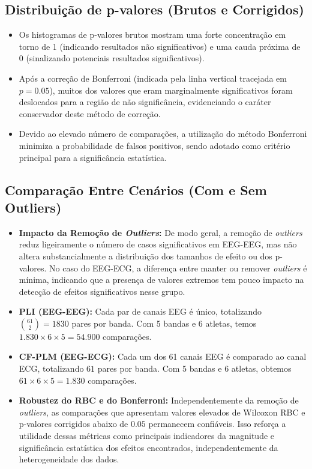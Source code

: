 \subsection{Distribuição de p-valores (Brutos e Corrigidos)}
\begin{itemize}
    \item Os histogramas de p-valores brutos mostram uma forte concentração em torno de 1 (indicando resultados não significativos) e uma cauda próxima de 0 (sinalizando potenciais resultados significativos).
    \item Após a correção de Bonferroni (indicada pela linha vertical tracejada em \(p=0.05\)), muitos dos valores que eram marginalmente significativos foram deslocados para a região de não significância, evidenciando o caráter conservador deste método de correção.
    \item Devido ao elevado número de comparações, a utilização do método Bonferroni minimiza a probabilidade de falsos positivos, sendo adotado como critério principal para a significância estatística.
\end{itemize}

\subsection{Comparação Entre Cenários (Com e Sem Outliers)}
\begin{itemize}
    \item \textbf{Impacto da Remoção de \textit{Outliers}:} De modo geral, a remoção de \textit{outliers} reduz ligeiramente o número de casos significativos em EEG-EEG, mas não altera substancialmente a distribuição dos tamanhos de efeito ou dos p-valores. No caso do EEG-ECG, a diferença entre manter ou remover \textit{outliers} é mínima, indicando que a presença de valores extremos tem pouco impacto na detecção de efeitos significativos nesse grupo.
    \item \textbf{PLI (EEG-EEG):} Cada par de canais EEG é único, totalizando \(\binom{61}{2}=1830\) pares por banda. Com 5 bandas e 6 atletas, temos \(1.830\times6\times5=54.900\) comparações.
    \item \textbf{CF-PLM (EEG-ECG):} Cada um dos 61 canais EEG é comparado ao canal ECG, totalizando \(61\) pares por banda. Com 5 bandas e 6 atletas, obtemos \(61\times6\times5=1.830\) comparações.
    \item \textbf{Robustez do RBC e do Bonferroni:} Independentemente da remoção de \textit{outliers}, as comparações que apresentam valores elevados de Wilcoxon RBC e p-valores corrigidos abaixo de \( 0.05 \) permanecem confiáveis. Isso reforça a utilidade dessas métricas como principais indicadores da magnitude e significância estatística dos efeitos encontrados, independentemente da heterogeneidade dos dados.
\end{itemize}

